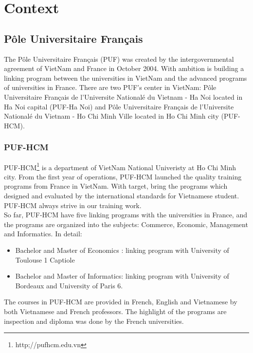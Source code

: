 \chapter{Context}
\section{P\^{o}le Universitaire Fran\c{c}ais}
The P\^{o}le Universitaire Fran\c{c}ais (PUF) was created by the intergovernmental agreement of VietNam and France in October 2004. With ambition is building a linking program between the universities in VietNam and the advanced programs of universities in France. There are two PUF's center in VietNam: P\^{o}le Universitaire Fran\c{c}ais de l'Universite National\'{e} du Vietnam - Ha Noi located in Ha Noi capital (PUF-Ha Noi) and P\^{o}le Universitaire Fran\c{c}ais de l'Universite National\'{e} du Vietnam - Ho Chi Minh Ville located in Ho Chi Minh city (PUF-HCM).

\subsection*{PUF-HCM}
PUF-HCM\footnote{http;//pufhcm.edu.vn} is a department of VietNam National Univeristy at Ho Chi Minh city. From the first year of operations, PUF-HCM launched the quality training programs from France in VietNam. With target, bring the programs which designed and evaluated by the international standards for Vietnamese student. PUF-HCM always strive in our training work.\\
So far, PUF-HCM have five linking programs with the universities in France, and the programs are organized into the subjects: Commerce, Economic, Management and Informatics. In detail:
\begin{itemize}
\item Bachelor and Master of Economics : linking program with University of Toulouse 1 Captiole
\item Bachelor and Master of Informatics: linking program with University of Bordeaux and University of Paris 6.
\end{itemize}
The courses in PUF-HCM are provided in French, English and Vietnamese by both Vietnamese and French professors. The highlight of the programs are inspection and diploma was done by the French universities.
